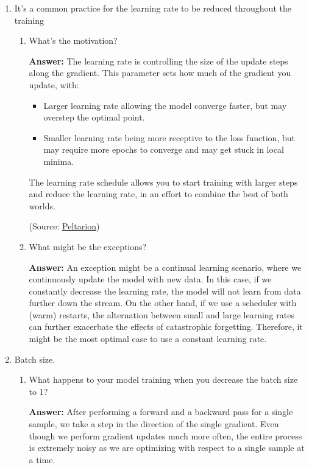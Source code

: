 \documentclass{article}
\newenvironment{QandA}{\begin{enumerate}[label=\arabic*.]}{\end{enumerate}}
\newenvironment{InnerQandA}{\begin{enumerate}[label=\roman*.]}{\end{enumerate}}
\newenvironment{answer}{\par\normalfont \textbf{Answer:}}{}
\begin{document}
\begin{QandA}
    \item It’s a common practice for the learning rate to be reduced throughout the training
    \begin{InnerQandA}
        \item What’s the motivation?
        \begin{answer}
            The learning rate is controlling the size of the update steps along the gradient. This parameter sets how much of the gradient you update, with:
            \begin{itemize}
                \item Larger learning rate allowing the model converge faster, but may overstep the optimal point.
                \item Smaller learning rate being more receptive to the loss function, but may require more epochs to converge and may get stuck in local minima.
            \end{itemize}
            The learning rate schedule allows you to start training with larger steps and reduce the learning rate, in an effort to combine the best of both worlds.

            (Source: \href{https://peltarion.com/knowledge-center/modeling-view/run-a-model/optimization-principles-(in-deep-learning)/learning-rate-schedule}{Peltarion})
        \end{answer}

        \item What might be the exceptions?
        \begin{answer}
            An exception might be a continual learning scenario, where we continuously update the model with new data. In this case, if we constantly decrease the learning rate, the model will not learn from data further down the stream. On the other hand, if we use a scheduler with (warm) restarts, the alternation between small and large learning rates can further exacerbate the effects of catastrophic forgetting. Therefore, it might be the most optimal case to use a constant learning rate.
        \end{answer}
    \end{InnerQandA}

    \item Batch size.
    \begin{InnerQandA}
        \item What happens to your model training when you decrease the batch size to 1?
        \begin{answer}
            After performing a forward and a backward pass for a single sample, we take a step in the direction of the single gradient. Even though we perform gradient updates much more often, the entire process is extremely noisy as we are optimizing with respect to a single sample at a time.
        \end{answer}


\end{InnerQandA}
\end{QandA}
\end{document}

